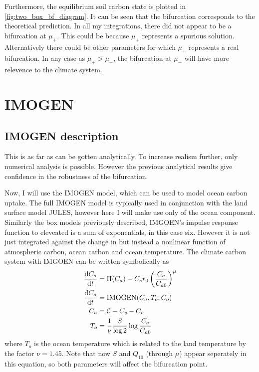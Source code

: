 Furthermore, the equilibrium soil carbon state is plotted in \cref{fig:two_box_bf_diagram}. It can be seen that the bifurcation corresponds to the theoretical prediction.
In all my integrations, there did not appear to be a bifurcation at $\mu_+$. This could be because $\mu_+$ represents a spurious solution. Alternatively there could be other
parameters for which $\mu_+$ represents a real bifurcation. In any case as $\mu_+ > \mu_-$, the bifurcation at $\mu_-$ will have more relevence to the climate system.
\section{IMOGEN}
\subsection{IMOGEN description}
This is as far as can be gotten analytically. To increase realism further, only numerical analysis is possible. However the previous analytical results give confidence in the robustness
of the bifurcation.

Now, I will use the IMOGEN model, which can be used to model ocean carbon uptake. The full IMOGEN model is typically used in conjunction with the land surface model JULES,
however here I will make use only of the ocean component. Similarly the box models previously described, IMGOEN's impulse response function to eleveated  is a sum of exponentials,
in this case six.
However it is not just integrated against the change in  but instead a nonlinear function of atmospheric carbon, ocean carbon and ocean temperature. The climate carbon system with IMGOEN
can be written symbolically as
\begin{subequations}
  \label{eq:imogen_deterministic}
  \begin{align}
    \dv{C_s}{t}     &= \Pi(C_a) - C_s r_0 \left(\frac{C_a}{C_{a0}}\right)^\mu \\
    \dv{C_o}{t}     &= \mathrm{IMOGEN}(C_a,T_o,C_o) \\
    C_a             &= \mathcal{C} - C_s - C_o \\
    T_o             &= \frac{1}{\nu}\frac{S}{\log 2}\log \frac{C_a}{C_{a0}}
  \end{align}
\end{subequations}
where $T_o$ is the ocean temperature which is related to the land temperature by the factor $\nu = 1.45$. Note that now $S$ and $Q_{10}$ (through $\mu$) appear seperately in this equation,
so both parameters will affect the bifurcation point.

